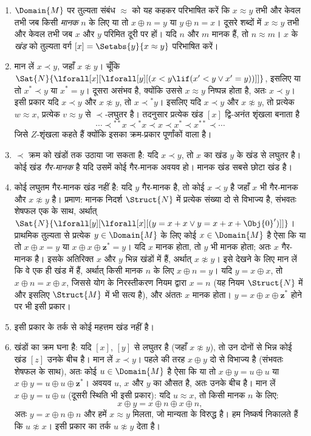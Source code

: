 \documentclass[../../../include/open-logic-section]{subfiles}
\begin{document}
\begin{enumerate}
  दोनों मानक हैं (और एक के गैर-मानक होने पर दोनों गैर-मानक)।
\item $\Domain{M}$ पर तुल्यता संबंध $\approx$ को यह कहकर परिभाषित करें कि
  $x \approx y$ तभी और केवल तभी जब किसी \emph{मानक} $n$ के लिए या तो $x
  \oplus n = y$ या $y \oplus n =x$। दूसरे शब्दों में $x \approx y$ तभी और
  केवल तभी जब $x$ और $y$ परिमित दूरी पर हों। यदि $n$ और $m$ मानक हैं, तो
  $n \approx m$। $x$ के \emph{खंड} को तुल्यता वर्ग $[x] = \Setabs{y}{x
  \approx y}$ परिभाषित करें।
\item मान लें $x \prec y$, जहाँ $x \not\approx y$। चूँकि
  $\Sat{N}{\lforall[x][\lforall[y][(x < y \lif (x' < y \lor x' =
      y))]]}$, इसलिए या तो $x^* \prec y$ या $x^* = y$। दूसरा असंभव है,
  क्योंकि उससे $x \approx y$ निष्पन्न होता है, अतः $x \prec y$। इसी प्रकार
  यदि $x \prec y$ और $x \not\approx y$, तो $x \prec {^*y}$। इसलिए यदि $x
  \prec y$ और $x \not\approx y$, तो प्रत्येक $w \approx x$, प्रत्येक $v
  \approx y$ से $\prec$-लघुतर है। तदनुसार प्रत्येक खंड $[x]$ द्वि-अनंत
  शृंखला बनाता है
  \[
  \cdots \prec  {^{**}x} \prec {^*}x \prec x \prec x^* \prec x^{**}
  \prec \cdots
  \]
  जिसे $Z$-शृंखला कहते हैं क्योंकि इसका क्रम-प्रकार पूर्णांकों वाला है।
\item $\prec$ क्रम को खंडों तक उठाया जा सकता है: यदि $x \prec y$, तो $x$ का
  खंड $y$ के खंड से लघुतर है। कोई खंड \emph{गैर-मानक} है यदि उसमें कोई
  गैर-मानक अवयव हो। मानक खंड सबसे छोटा खंड है।
\item कोई लघुतम गैर-मानक खंड नहीं है: यदि $y$ गैर-मानक है, तो कोई $x \prec
  y$ है जहाँ $x$ भी गैर-मानक और $x \not\approx y$ है। प्रमाण: मानक निदर्श
  $\Struct{N}$ में प्रत्येक संख्या दो से विभाज्य है, संभवतः शेषफल एक के साथ,
  अर्थात्
  $\Sat{N}{\lforall[y][\lforall[x][(y = x + x \lor y = x + x +
        \Obj{0}')]]}$। प्राथमिक तुल्यता से प्रत्येक $y \in \Domain{M}$ के
  लिए कोई $x \in \Domain{M}$ है ऐसा कि या तो $x \oplus x = y$ या $x
  \oplus x \oplus \mathbf{z}^*= y$। यदि $x$ मानक होता, तो $y$ भी मानक
  होता; अतः $x$ गैर-मानक है। इसके अतिरिक्त $x$ और $y$ भिन्न खंडों में हैं,
  अर्थात् $x \not\approx y$। इसे देखने के लिए मान लें कि वे एक ही खंड में
  हैं, अर्थात् किसी मानक $n$ के लिए $x \oplus n = y$। यदि $y = x \oplus
  x$, तो $x \oplus n = x \oplus x$, जिससे योग के निरस्तीकरण नियम द्वारा $x
  = n$ (यह नियम $\Struct{N}$ में और इसलिए $\Struct{M}$ में भी सत्य है), और
  अंततः $x$ मानक होता। $y = x \oplus x \oplus \mathbf{z}^*$ होने पर भी इसी
  प्रकार।
\item इसी प्रकार के तर्क से कोई महत्तम खंड नहीं है।
\item खंडों का क्रम घना है: यदि $[x]$, $[y]$ से लघुतर है (जहाँ $x
  \not\approx y$), तो उन दोनों से भिन्न कोई खंड $[z]$ उनके बीच है। मान लें
  $x \prec y$। पहले की तरह $x \oplus y$ दो से विभाज्य है (संभवतः शेषफल के
  साथ), अतः कोई $u \in \Domain{M}$ है ऐसा कि या तो $x \oplus y = u \oplus
  u$ या $x \oplus y = u \oplus u \oplus \mathbf{z}^*$। अवयव $u$, $x$ और
  $y$ का औसत है, अतः उनके बीच है। मान लें $x \oplus y = u \oplus u$ (दूसरी
  स्थिति भी इसी प्रकार): यदि $u \approx x$, तो किसी मानक $n$ के लिए:
  \[
  x \oplus y = x \oplus n \oplus x \oplus n,
  \]
  अतः $y = x \oplus n \oplus n$ और हमें $x \approx y$ मिलता, जो मान्यता के
  विरुद्ध है। हम निष्कर्ष निकालते हैं कि $u \not\approx x$। इसी प्रकार का
  तर्क $u \not\approx y$ देता है।
\end{enumerate}
\end{document}
